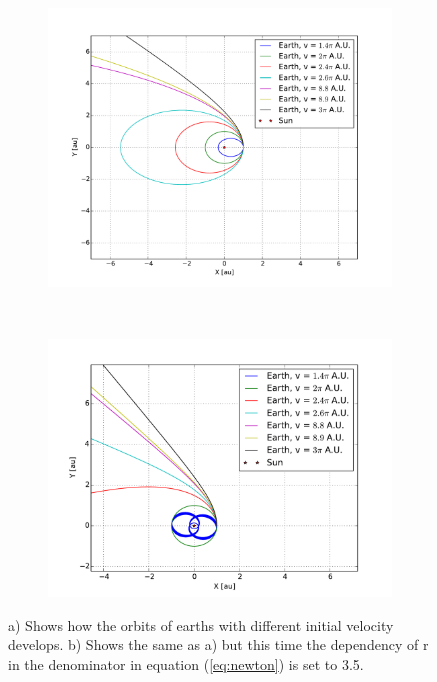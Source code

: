 \begin{figure}[H]
    \centering
    \begin{subfigure}{0.5\textwidth}
        \centering
        \includegraphics[width=\linewidth]{result/bilder/escape-velocity.pdf}
    	\caption{}
    \end{subfigure}%
    ~ 
    \begin{subfigure}{0.5\textwidth}
        \centering
        \includegraphics[width=\linewidth]{result/bilder/escape-velocity-r25.pdf}
        \caption{}
    \end{subfigure}
    \caption{a) Shows how the orbits of earths with different initial velocity develops. b) Shows the same as a) but this time the dependency of r in the denominator in equation (\ref{eq:newton}) is set to 3.5.}
    \label{fig:escape-velocity-low}
\end{figure}



